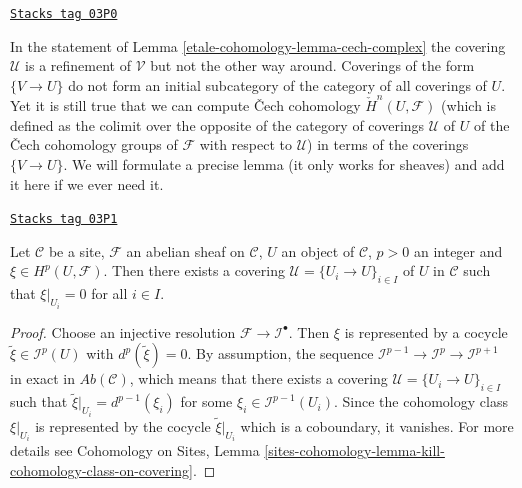 \begin{remark}[Refinement]
\label{etale-cohomology-remark-refinement}
\href{https://stacks.math.columbia.edu/tag/03P0}{\texttt{Stacks tag 03P0}}

In the statement of Lemma \ref{etale-cohomology-lemma-cech-complex} the covering $\mathcal{U}$
is a refinement of $\mathcal{V}$ but not the other way around. Coverings
of the form $\{V \to U\}$ do not form an initial subcategory of the
category of all coverings of $U$. Yet it is still true that
we can compute {\v C}ech cohomology $\check H^n(U, \mathcal{F})$ (which
is defined as the colimit over the opposite of the category of
coverings $\mathcal{U}$ of $U$ of the {\v C}ech cohomology groups of
$\mathcal{F}$ with respect to $\mathcal{U}$) in terms of the coverings
$\{V \to U\}$. We will formulate a precise lemma (it only works for sheaves)
and add it here if we ever need it.
\end{remark}

\begin{lemma}

\label{etale-cohomology-lemma-locality-cohomology}
\href{https://stacks.math.columbia.edu/tag/03P1}{\texttt{Stacks tag 03P1}}

Let $\mathcal{C}$ be a site, $\mathcal{F}$ an abelian sheaf on $\mathcal{C}$,
$U$ an object of $\mathcal{C}$, $p > 0$ an integer and $\xi \in
H^p(U, \mathcal{F})$. Then there exists a covering
$\mathcal{U} = \{U_i \to U\}_{i \in I}$ of $U$ in $\mathcal{C}$
such that $\xi |_{U_i} = 0$ for all $i \in I$.
\end{lemma}

\begin{proof}
Choose an injective resolution $\mathcal{F} \to \mathcal{I}^\bullet$. Then
$\xi$ is represented by a cocycle $\tilde{\xi} \in \mathcal{I}^p(U)$
with $d^p(\tilde{\xi}) = 0$. By assumption, the sequence
$\mathcal{I}^{p - 1} \to \mathcal{I}^p \to \mathcal{I}^{p + 1}$ in exact in
$\textit{Ab}(\mathcal{C})$, which means that there exists a covering
$\mathcal{U} = \{U_i \to U\}_{i \in I}$ such that
$\tilde{\xi}|_{U_i} = d^{p - 1}(\xi_i)$ for some
$\xi_i \in \mathcal{I}^{p-1}(U_i)$. Since
the cohomology class $\xi|_{U_i}$ is represented by the cocycle
$\tilde{\xi}|_{U_i}$ which is a coboundary, it vanishes.
For more details see
Cohomology on Sites,
Lemma \ref{sites-cohomology-lemma-kill-cohomology-class-on-covering}.
\end{proof}

